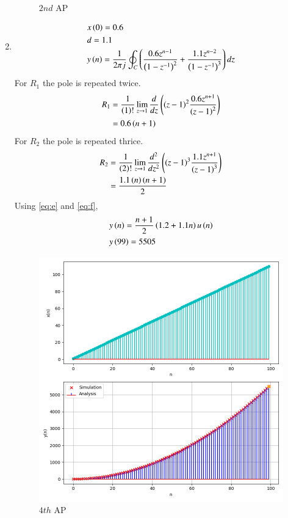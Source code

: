 \documentclass[journal,12pt,twocolumn]{IEEEtran}
\theoremstyle{remark}
\begin{document}
\begin{enumerate}[label=(\alph*)]
\begin{figure}[h!]
        \caption{$2nd$ AP}
    \end{figure}
    \item \begin{align}
        &x\left(0\right)=0.6 \\
        &d=1.1 \\
        &y\left(n\right)=\frac{1}{2\pi j}\oint_{C}\left(\dfrac{0.6z^{n-1}}{\left(1-z^{-1}\right)^2} + \dfrac{1.1z^{n-2}}{\left(1-z^{-1}\right)^{3}}\right)dz
    \end{align}
    For $R_1$ the pole is repeated twice.
\begin{align}
    R_1&=\frac{1}{\left(1\right)!}\lim\limits_{z\to 1}\frac{d}{dz}\left({\left(z-1\right)}^{2}\frac{0.6z^{n+1}}{{\left(z-1\right)}^2}\right)\\
    &=0.6\left(n+1\right)\label{eq:e}
\end{align}
    For $R_2$ the pole is repeated thrice.
\begin{align}
    R_2&=\frac{1}{\left(2\right)!}\lim\limits_{z\to 1}\frac{d^{2}}{dz^{2}}\left({\left(z-1\right)}^{3}\frac{1.1z^{n+1}}{{\left(z-1\right)}^3}\right)\\
    &=\frac{1.1\left(n\right)\left(n+1\right)}{2}\label{eq:f}
\end{align}
Using \eqref{eq:e} and \eqref{eq:f},
\begin{align}
    &y\left(n\right)=\dfrac{n+1}{2}\left(1.2+1.1n\right)u\left(n\right)\\
    &y\left(99\right)=5505
\end{align}
    \begin{figure}[h!]
        \centering
        \includegraphics[width=\columnwidth]{figs/plt3.png}
        \caption{$4th$ AP}
    \end{figure}


\end{enumerate}
\end{document}
